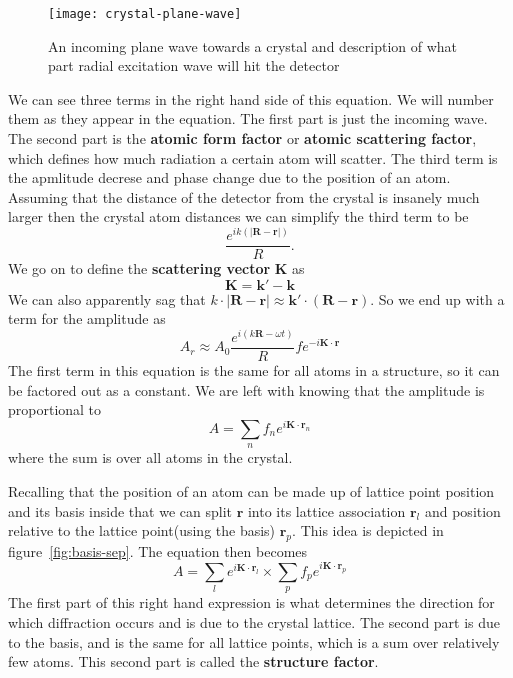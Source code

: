 \documentclass[11pt]{article}
\begin{document}
\begin{figure}[!ht]
	\centering
	\texttt{[image: crystal-plane-wave]}
	\caption{An incoming plane wave towards a crystal and description of what part radial excitation wave will hit the detector}
	\label{fig:crystal-plane-wave}
\end{figure}

We can see three terms in the right hand side of this equation. We will number them as they appear in the equation. The first part is just the incoming wave. The second part is the \textbf{atomic form factor} or \textbf{atomic scattering factor}, which defines how much radiation a certain atom will scatter. The third term is the apmlitude decrese and phase change due to the position of an atom. Assuming that the distance of the detector from the crystal is insanely much larger then the crystal atom distances we can simplify the third term to be
\begin{equation}
	\frac{e^{ik(|\mathbf{R} - \mathbf{r}|)}}{R}.
\end{equation}
We go on to define the \textbf{scattering vector} $\mathbf{K}$ as 
\begin{equation}
	\mathbf{K} = \mathbf{k}'-\mathbf{k}
\end{equation}
We can also apparently sag that $k \cdot |\mathbf{R}-\mathbf{r}| \approx \mathbf{k}'\cdot (\mathbf{R}-\mathbf{r})$. So we end up with a term for the amplitude as 
\begin{equation}
	A_r \approx A_0 \frac{e^{i(k\mathbf{R}-\omega t)}}{R} f e^{-i\mathbf{K} \cdot \mathbf{r}}
\end{equation}
The first term in this equation is the same for all atoms in a structure, so it can be factored out as a constant. We are left with knowing that the amplitude is proportional to
\begin{equation}
	A = \sum_n f_n e^{i\mathbf{K} \cdot \mathbf{r}_n}
\end{equation}
where the sum is over all atoms in the crystal.

Recalling that the position of an atom can be made up of lattice point position and its basis inside that we can split $\mathbf{r}$ into its lattice association $\mathbf{r}_l$ and position relative to the lattice point(using the basis) $\mathbf{r}_p$. This idea is depicted in figure~\ref{fig:basis-sep}. The equation then becomes
\begin{equation}
	A = \sum_l  e^{i\mathbf{K} \cdot \mathbf{r}_l} \times \sum_p f_p e^{i\mathbf{K} \cdot \mathbf{r}_p}
	\label{eq:ampl}
\end{equation}
The first part of this right hand expression is what determines the direction for which diffraction occurs and is due to the crystal lattice. The second part is due to the basis, and is the same for all lattice points, which is a sum over relatively few atoms. This second part is called the \textbf{structure factor}.
\end{document}
